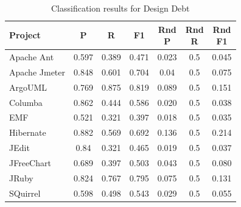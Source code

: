 \appendix{}
\label{sec:appendix}

\begin{table}[!hbt]
    \begin{center}
        \caption{Classification results for Design Debt}
        \label{tbl:classifier_results_design}
        \begin{tabular}{l| c c c c c c}
        \toprule
        \textbf{Project} & \textbf{P} & \textbf{R} & \textbf{F1} & \thead{Rnd\\P} & \thead{Rnd\\R} & \thead{Rnd\\F1} \\
        \midrule
        Apache Ant    &               0.597 &            0.389 &        0.471 &                     0.023 &                    0.5 &              0.045 \\
        Apache Jmeter &               0.848 &            0.601 &        0.704 &                     0.04  &                    0.5 &              0.075 \\
        ArgoUML       &               0.769 &            0.875 &        0.819 &                     0.089 &                    0.5 &              0.151 \\
        Columba       &               0.862 &            0.444 &        0.586 &                     0.020 &                    0.5 &              0.038 \\
        EMF           &               0.521 &            0.321 &        0.397 &                     0.018 &                    0.5 &              0.035 \\
        Hibernate     &               0.882 &            0.569 &        0.692 &                     0.136 &                    0.5 &              0.214 \\
        JEdit         &                0.84 &            0.321 &        0.465 &                     0.019 &                    0.5 &              0.037 \\
        JFreeChart    &               0.689 &            0.397 &        0.503 &                     0.043 &                    0.5 &              0.080 \\
        JRuby         &               0.824 &            0.767 &        0.795 &                     0.075 &                    0.5 &              0.131 \\
        SQuirrel      &               0.598 &            0.498 &        0.543 &                     0.029 &                    0.5 &              0.055 \\
        \bottomrule
        \end{tabular}
    \end{center}    
\end{table}

